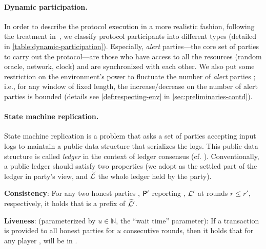 \paragraph{Dynamic participation.}
%
In order to describe the protocol execution in a more realistic fashion, following the treatment in~\cite{CCS:BGKRZ18}, we classify protocol participants into different types (detailed in \cref{table:dynamic-participation}).
%
Especially, \emph{alert} parties---the core set of parties to carry out the protocol---are those who have access to all the resources (random oracle, network, clock) and are synchronized with each other.
%
We also put some restriction on the environment's power to fluctuate the number of \emph{alert} parties \cite{C:GarKiaLeo17,EPRINT:GarKiaLeo20}; i.e., for any window of fixed length, the increase/decrease on the number of alert parties is bounded (details see \cref{def:respecting-env} in \cref{sec:preliminaries-contd}).

\paragraph{State machine replication.}
%
State machine replication \cite{CSUR:Schneider90} is a problem that asks a set of parties accepting input logs to maintain a public data structure that serializes the logs.
%
This public data structure is called \emph{ledger} in the context of ledger consensus (cf. \cite{EC:GarKiaLeo15,RSA:GarKia20}).
%
Conventionally, a public ledger should satisfy two properties (we adopt \ledger as the settled part of the ledger in party's view, and $\widetilde{\mathcal{L}}$ the whole ledger held by the party).
%
\begin{cccItemize}[noitemsep]
    \item \textbf{Consistency}: For any two honest parties \party, $\mathsf{P}'$ reporting \ledger, $\mathcal{L}'$ at rounds $r \le r'$, respectively, it holds that \ledger is a prefix of $\widetilde{\mathcal{L}'}$.
    
    \item \textbf{Liveness}: (parameterized by $u \in \mathbb{N}$, the ``wait time'' parameter): If a transaction \tx is provided to all honest parties for $u$ consecutive rounds, then it holds that for any player \party, \tx will be in \ledger.
\end{cccItemize}
